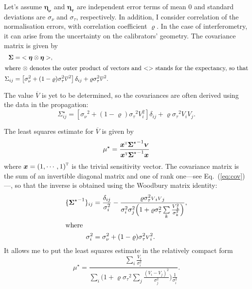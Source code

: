 \documentclass[a4paper,fleqn,usenatbib]{mnras}
\def\eqref#1{Eq.~(\ref{eq:#1})}
\def\vec#1{\ensuremath{\boldsymbol{#1}}}
\def\tr#1{\ensuremath{{#1}^\text{\textsc{t}}}}
\def\expect#1{\ensuremath{ {<#1>} }}
\def\ppp#1{#1^\star}
\def\norm{_\tau}
\def\meas{_\nu}
\def\mean#1{\overline{#1}}
\let\outer=\otimes
\def\data{\ensuremath{{\scriptstyle V}}}
\def\vdata{\ensuremath{\vec\data}}
\def\datamean{\ensuremath{\mean\data}}
\def\mod{\ensuremath{\mu}}
\def\error{\ensuremath{\eta}}
\def\verror{\ensuremath{\vec\error}}
\def\relerror{\ensuremath{\error\norm}}
\def\abserror{\ensuremath{\error\meas}}
\def\vrelerror{\ensuremath{\vec\relerror}}
\def\vabserror{\ensuremath{\vec\abserror}}
\def\dev{\ensuremath{\sigma}}
\def\reldev{\ensuremath{\dev\norm}}
\def\absdev{\ensuremath{\dev\meas}}
\def\cov{\ensuremath{\Sigma}}
\def\vcov{\ensuremath{\vec\cov}}
\def\corr{\ensuremath{\varrho}}
\def\sens{\ensuremath{x}}
\def\vsens{\ensuremath{\vec\sens}}
\begin{document}
Let's assume $\vabserror$ and $\vrelerror$ are independent error terms of mean 0 and standard deviations are $\absdev$ and $\reldev$, respectively. In addition, I consider correlation of the normalisation errors, with correlation coefficient $\corr$.  In the case of interferometry, it can arise from the uncertainty on the calibrators' geometry.  The covariance matrix is given by
\begin{align}
    \vcov     &= \expect{\verror\outer\verror},\\
\intertext{where $\outer$ denotes the outer product of vectors and $\expect{}$ stands for the expectancy, so that}
    \cov_{ij} &= \left[ \absdev^2 
                  + (1-\corr)\reldev^2\datamean^2
                \right] \delta_{ij} 
            + \corr\reldev^2\datamean^2.
\end{align}

The value $\datamean$ is yet to be determined, so the covariances are often derived using the data in the propagation:
\begin{equation}
    \ppp{\cov_{ij}} = \left[ 
                    \absdev^2 
                  + (1-\corr)\reldev^2 \data_i^2
                \right] \delta_{ij} 
            + \corr\reldev^2\data_i\data_j. \label{eq:cov}
\end{equation}

The least squares estimate for $\datamean$ is given by
\begin{equation}
    \ppp{\mod} =
                  \frac { \tr\vsens{\ppp\vcov}^{-1}\vdata }
                        { \tr\vsens{\ppp\vcov}^{-1}\vsens }
\end{equation}
where $\vsens = \tr{(1, \cdots, 1)}$ is the trivial sensitivity vector.  The covariance matrix is the sum of an invertible diagonal matrix and one of rank one---see \eqref{cov}---, so that the inverse is obtained using the Woodbury matrix identity: 
\begin{align}
    \{ {\ppp\vcov}^{-1} \}_{ij} &= \frac{\delta_{ij}}{\dev_i^2}
         - \frac{\corr\reldev^2\data_i\data_j}
                {\dev_i^2\dev_j^2\Big(1 + 
            \corr\reldev^2\sum\limits_{k} \frac{\data_k^2}{\dev_k^2}\Big)},\\
  \intertext{where}
  \dev_i^2 &= \absdev^2+(1-\corr)\reldev^2\data_i^2.
\end{align}
It allows me to put the least squares estimate in the relatively compact form 
\begin{equation}
  \ppp{\mod} = 
    \frac { 
      \sum\limits_i \frac{\data_i}{\dev_i^2}
    }{ 
      \sum\limits_i 
          \Big( 1   
             + \corr\reldev^2\sum\limits_{j} \frac{(\data_i-\data_j)^2}{\dev_j^2}
           \Big)
          \frac{1}{\dev_i^2} 
   }.\label{eq:mu}
\end{equation}
\end{document}
